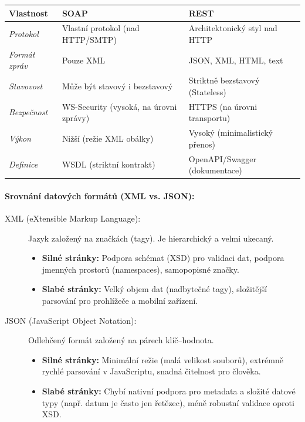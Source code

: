 \begin{table}[h]
\centering
\begin{tabular}{|l|l|l|}
\hline
\textbf{Vlastnost} & \textbf{SOAP} & \textbf{REST} \\ \hline
\textit{Protokol} & Vlastní protokol (nad HTTP/SMTP) & Architektonický styl nad HTTP \\ \hline
\textit{Formát zpráv} & Pouze XML & JSON, XML, HTML, text \\ \hline
\textit{Stavovost} & Může být stavový i bezstavový & Striktně bezstavový (Stateless) \\ \hline
\textit{Bezpečnost} & WS-Security (vysoká, na úrovni zprávy) & HTTPS (na úrovni transportu) \\ \hline
\textit{Výkon} & Nižší (režie XML obálky) & Vysoký (minimalistický přenos) \\ \hline
\textit{Definice} & WSDL (striktní kontrakt) & OpenAPI/Swagger (dokumentace) \\ \hline
\end{tabular}
\end{table}

\paragraph*{Srovnání datových formátů (XML vs. JSON):}

\begin{description}
    \item[XML (eXtensible Markup Language):] 
    Jazyk založený na značkách (tagy). Je hierarchický a velmi ukecaný.
    \begin{itemize}
        \item \textbf{Silné stránky:} Podpora schémat (XSD) pro validaci dat, podpora jmenných prostorů (namespaces), samopopisné značky.
        \item \textbf{Slabé stránky:} Velký objem dat (nadbytečné tagy), složitější parsování pro prohlížeče a mobilní zařízení.
    \end{itemize}

    \item[JSON (JavaScript Object Notation):] 
    Odlehčený formát založený na párech klíč–hodnota.
    \begin{itemize}
        \item \textbf{Silné stránky:} Minimální režie (malá velikost souborů), extrémně rychlé parsování v JavaScriptu, snadná čitelnost pro člověka.
        \item \textbf{Slabé stránky:} Chybí nativní podpora pro metadata a složité datové typy (např. datum je často jen řetězec), méně robustní validace oproti XSD.
    \end{itemize}
\end{description}

